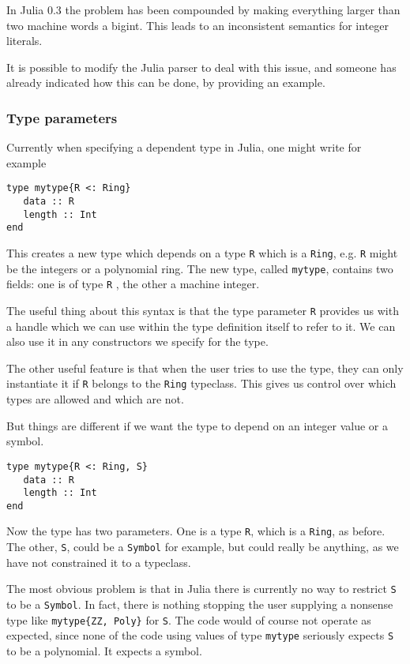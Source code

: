 \documentclass[a4paper,10pt]{article}
\newcommand{\code}{\lstinline}
\begin{document}
In Julia 0.3 the problem has been compounded by making everything larger than two machine
words a bigint. This leads to an inconsistent semantics for integer literals.

It is possible to modify the Julia parser to deal with this issue, and someone has already indicated
how this can be done, by providing an example.

\subsubsection{Type parameters}

Currently when specifying a dependent type in Julia, one might write for example

\begin{lstlisting}
type mytype{R <: Ring}
   data :: R
   length :: Int
end
\end{lstlisting}

This creates a new type which depends on a type \code{R} which is a \code{Ring}, e.g. \code{R}  might
be the integers or a polynomial ring. The new type, called \code{mytype}, contains two fields: one is
of type \code{R} , the other a machine integer.

The useful thing about this syntax is that the type parameter \code{R} provides us with a handle which
we can use within the type definition itself to refer to it. We can also use it in any constructors we
specify for the type. 

The other useful feature is that when the user tries to use the type, they can only instantiate it if 
\code{R} belongs to the \code{Ring} typeclass. This gives us control over which types are allowed and
which are not.

But things are different if we want the type to depend on an integer value or a symbol.

\begin{lstlisting}
type mytype{R <: Ring, S}
   data :: R
   length :: Int
end
\end{lstlisting}

Now the type has two parameters. One is a type \code{R}, which is a \code{Ring}, as before. The other,
\code{S}, could be a \code{Symbol} for example, but could really be anything, as we have not 
constrained it to a typeclass.

The most obvious problem is that in Julia there is currently no way to restrict \code{S} to be a 
\code{Symbol}. In fact, there is nothing stopping the user supplying a nonsense type like 
\code|mytype{ZZ, Poly}| for \code{S}. The code would of course not operate as expected, since none of
the code using values of type \code{mytype} seriously expects \code{S} to be a polynomial. It expects
a symbol. 
\end{document}
